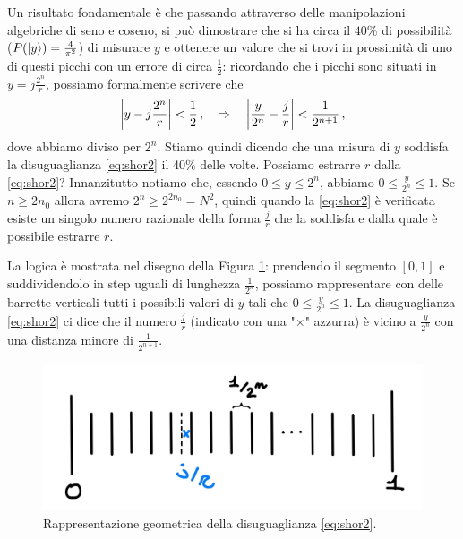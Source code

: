 \noindent Un risultato fondamentale è che passando attraverso delle manipolazioni algebriche di seno e coseno, si può dimostrare che si ha circa il $40$\% di possibilità ($P(\ket{y}) = \frac{4}{\pi^2}$) di misurare $y$ e ottenere un valore che si trovi in prossimità di uno di questi picchi con un errore di circa $\frac 12$: ricordando che i picchi sono situati in $y = j \frac{2^n}{r}$, possiamo formalmente scrivere che
\begin{equation}
    \abs{y-j\frac{2^n}{r}} < \frac 12 \, , \quad \Rightarrow \quad 
    \abs{\frac y{2^n}-\frac jr} < \frac 1{2^{n+1}} \, ,
    \label{eq:shor2}
\end{equation}
dove abbiamo diviso per $2^n$. Stiamo quindi dicendo che una misura di $y$ soddisfa la disuguaglianza \eqref{eq:shor2} il 40\% delle volte. Possiamo estrarre $r$ dalla \eqref{eq:shor2}? Innanzitutto notiamo che, essendo $0 \leq y \leq 2^n$, abbiamo $0 \leq \frac{y}{2^n} \leq 1$. Se $n \geq 2 n_0$ allora avremo $2^{n}\geq 2^{2n_0}=N^2$, quindi quando la \eqref{eq:shor2} è verificata esiste un singolo numero razionale della forma $\frac j r$ che la  soddisfa e dalla quale è possibile estrarre $r$. 

\noindent La logica è mostrata nel disegno della Figura \ref{fig:inequality_40}: prendendo il segmento $[0,1]$ e suddividendolo in step uguali di lunghezza $\frac{1}{2^n}$, possiamo rappresentare con delle barrette verticali tutti i possibili valori di $y$ tali che $0 \leq \frac{y}{2^n} \leq 1$. La disuguaglianza \eqref{eq:shor2} ci dice che il numero $\frac{j}{r}$ (indicato con una "$\times$" azzurra) è vicino a $\frac{y}{2^n}$ con una distanza minore di $\frac{1}{2^{n+1}}$. 
\begin{figure}[!ht]
    \centering
    \includegraphics[scale=0.3]{images/inequality_40}
    \caption{Rappresentazione geometrica della disuguaglianza \eqref{eq:shor2}.}
    \label{fig:inequality_40}
\end{figure}

